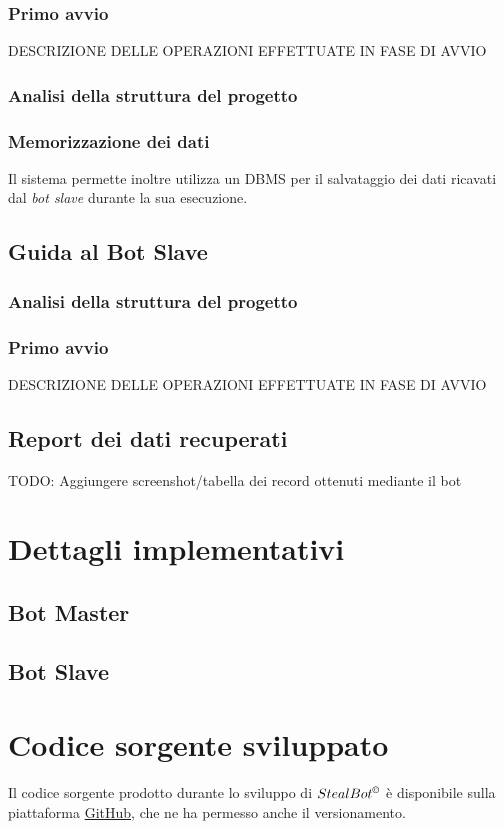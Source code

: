 \documentclass[letterpaper, 11pt]{article}
\begin{document}
\subsubsection{Primo avvio}
\label{sec:org576b8fb}
DESCRIZIONE DELLE OPERAZIONI EFFETTUATE IN FASE DI AVVIO
\subsubsection{Analisi della struttura del progetto}
\label{sec:orgb6999ac}
\subsubsection{Memorizzazione dei dati}
\label{sec:org2b7d50e}
Il sistema permette inoltre utilizza un DBMS \autocite{postgres} per il salvataggio dei dati ricavati dal \emph{bot slave} durante la sua esecuzione.
\subsection{Guida al Bot Slave}
\label{sec:org051f0c4}
\subsubsection{Analisi della struttura del progetto}
\label{sec:org68fd260}
\subsubsection{Primo avvio}
\label{sec:org7027353}
DESCRIZIONE DELLE OPERAZIONI EFFETTUATE IN FASE DI AVVIO
\subsection{Report dei dati recuperati}
\label{sec:org7923305}
TODO: Aggiungere screenshot/tabella dei record ottenuti mediante il bot
\section{Dettagli implementativi}
\label{sec:orgf2e10eb}
\subsection{Bot Master}
\label{sec:org20996e8}
\subsection{Bot Slave}
\label{sec:org0d59d31}
\section{Codice sorgente sviluppato}
\label{sec:org4488f9e}
Il codice sorgente prodotto durante lo sviluppo di \(StealBot^{\copyright}\) è disponibile sulla piattaforma \href{https://github.com/}{GitHub}, che ne ha permesso anche il versionamento.
\end{document}
